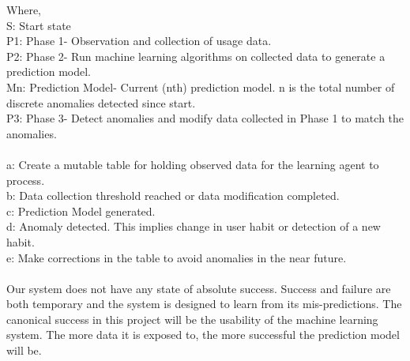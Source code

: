 Where,\\
\hspace*{1cm} S: Start state\\
\hspace*{1cm}P1: Phase 1- Observation and collection of usage data.\\
\hspace*{1cm}P2: Phase 2- Run machine learning algorithms on collected data to generate a prediction model.\\
\hspace*{1cm}Mn: Prediction Model- Current (nth) prediction model. n is the total number of discrete anomalies detected since start.\\
\hspace*{1cm}P3: Phase 3- Detect anomalies and modify data collected in Phase 1 to match the anomalies.\\\\
\hspace*{1cm}a: Create a mutable table for holding observed data for the learning agent to process.\\
\hspace*{1cm}b: Data collection threshold reached or data modification completed.\\
\hspace*{1cm}c: Prediction Model generated.\\
\hspace*{1cm}d: Anomaly detected. This implies change in user habit or detection of a new habit.\\
\hspace*{1cm}e: Make corrections in the table to avoid anomalies in the near future.\\

\paragraph{}
Our system does not have any state of absolute success. Success and failure are both temporary and the system is designed to learn from its mis-predictions. The canonical success in this project will be the usability of the machine learning system. The more data it is exposed to, the more successful the prediction model will be.

